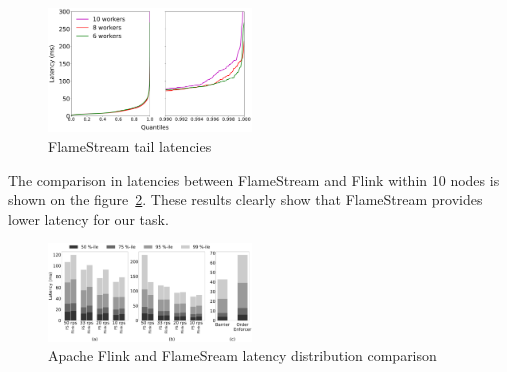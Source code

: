 \begin{figure}[htbp]
  \centering
  \includegraphics[width=0.48\textwidth]{pics/fs-index-quantiles}
  \caption{FlameStream tail latencies}
  \label {fs-index-quantiles}
\end{figure}

The comparison in latencies between FlameStream and Flink within 10 nodes is shown on the figure~\ref{comp-index-quantiles}. These results clearly show that FlameStream provides lower latency for our task.

\begin{figure}[htbp]
  \centering
  \includegraphics[width=0.48\textwidth]{pics/comp-index-quantiles}
  \caption{Apache Flink and FlameSream latency distribution comparison}
  \label {comp-index-quantiles}
\end{figure}
